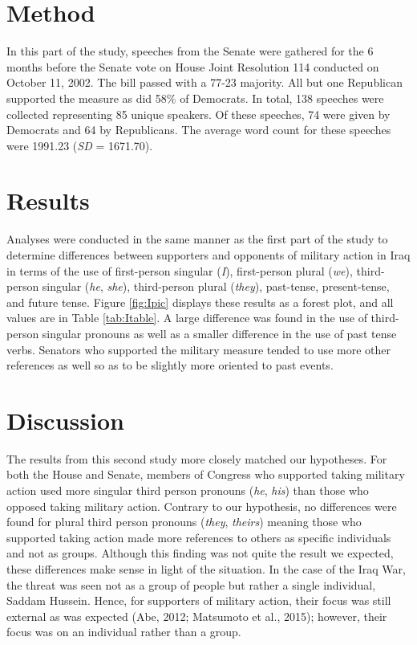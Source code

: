 \documentclass[english,man]{apa6}
\theoremstyle{definition}
\theoremstyle{definition}
\theoremstyle{definition}
\theoremstyle{remark}
\begin{document}
\section{Method}\label{method-4}

In this part of the study, speeches from the Senate were gathered for
the 6 months before the Senate vote on House Joint Resolution 114
conducted on October 11, 2002. The bill passed with a 77-23 majority.
All but one Republican supported the measure as did 58\% of Democrats.
In total, 138 speeches were collected representing 85 unique speakers.
Of these speeches, 74 were given by Democrats and 64 by Republicans. The
average word count for these speeches were 1991.23 (\emph{SD} =
1671.70).

\section{Results}\label{results-3}

Analyses were conducted in the same manner as the first part of the
study to determine differences between supporters and opponents of
military action in Iraq in terms of the use of first-person singular
(\emph{I}), first-person plural (\emph{we}), third-person singular
(\emph{he}, \emph{she}), third-person plural (\emph{they}), past-tense,
present-tense, and future tense. Figure \ref{fig:Ipic} displays these
results as a forest plot, and all values are in Table \ref{tab:Itable}.
A large difference was found in the use of third-person singular
pronouns as well as a smaller difference in the use of past tense verbs.
Senators who supported the military measure tended to use more other
references as well so as to be slightly more oriented to past events.

\section{Discussion}\label{discussion-1}

The results from this second study more closely matched our hypotheses.
For both the House and Senate, members of Congress who supported taking
military action used more singular third person pronouns (\emph{he},
\emph{his}) than those who opposed taking military action. Contrary to
our hypothesis, no differences were found for plural third person
pronouns (\emph{they}, \emph{theirs}) meaning those who supported taking
action made more references to others as specific individuals and not as
groups. Although this finding was not quite the result we expected,
these differences make sense in light of the situation. In the case of
the Iraq War, the threat was seen not as a group of people but rather a
single individual, Saddam Hussein. Hence, for supporters of military
action, their focus was still external as was expected (Abe, 2012;
Matsumoto et al., 2015); however, their focus was on an individual
rather than a group.
\end{document}

